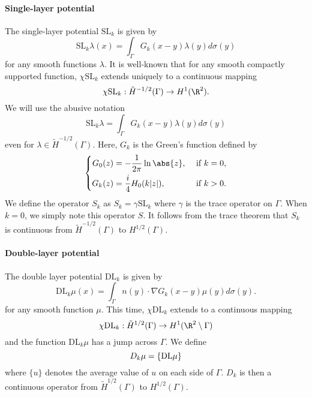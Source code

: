\documentclass[]{article}
\begin{document}
\paragraph{Single-layer potential}
The single-layer potential $\text{SL}_k$ is given by 
\begin{equation}
\text{SL}_k\lambda(x) = \int_{\Gamma}G_k(x-y)\lambda(y)d\sigma(y)
\end{equation}
for any smooth functions $\lambda$. It is well-known that for any smooth compactly supported function, $\chi \text{SL}_k$ extends uniquely to a continuous mapping
\[\chi \text{SL}_k : \tilde{H}^{-1/2}(\Gamma) \to H^1(\R^2).\] 
We will use the abusive notation
\[\text{SL}_k \lambda = \int_{\Gamma}G_k(x-y)\lambda(y)d\sigma(y) \]
even for $\lambda \in \tilde{H}^{-1/2}(\Gamma)$. 
Here, $G_k$ is the Green's function defined by 
\begin{equation}
\left\{
\begin{aligned}
G_0(z) &= -\dfrac{1}{2\pi} \ln \abs{z}, && \text{ if } k= 0,\\
G_k(z) &= \frac{i}{4}H_0(k|z|), && \text{ if } k > 0.
\end{aligned} \right.
\end{equation} 
We define the operator $S_k$ as $S_k = \gamma \text{SL}_k$ where $\gamma$ is the trace operator on $\Gamma$. When $k = 0$, we simply note this operator $S$. It follows from the trace theorem that $S_k$ is continuous from $\tilde{H}^{-1/2}(\Gamma)$ to $H^{1/2}(\Gamma)$. 
 
\paragraph{Double-layer potential}
The double layer potential $\text{DL}_k$ is given by 
\[\text{DL}_k \mu(x) = \int_{\Gamma} n(y) \cdot \nabla G_k(x-y) \mu(y) d\sigma(y).\]
for any smooth function $\mu$. This time, $\chi \text{DL}_k$ extends to a continuous mapping 
\[\chi \text{DL}_k : \tilde{H}^{1/2}(\Gamma) \to H^{1}(\R^2 \setminus \Gamma)\]
and the function $\text{DL}_k \mu$ has a jump across $\Gamma$. We define 
\[D_k \mu  = \lbrace\textup{DL} \mu \rbrace\]
where $\lbrace u \rbrace$ denotes the average value of $u$ on each side of $\Gamma$. $D_k$ is then a continuous operator from $\tilde{H}^{1/2}(\Gamma)$ to $H^{1/2}(\Gamma)$. 
\end{document}
